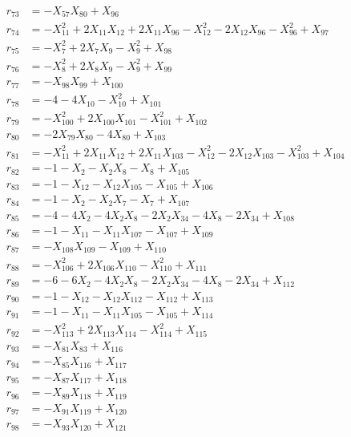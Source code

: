 \begin{align*}
r_{73} &= -X_{57}X_{80} + X_{96} \\[3pt]
r_{74} &= -X_{11}^{2} + 2X_{11}X_{12} + 2X_{11}X_{96} - X_{12}^{2} - 2X_{12}X_{96} - X_{96}^{2} + X_{97} \\[3pt]
r_{75} &= -X_{7}^{2} + 2X_{7}X_{9} - X_{9}^{2} + X_{98} \\[3pt]
r_{76} &= -X_{8}^{2} + 2X_{8}X_{9} - X_{9}^{2} + X_{99} \\[3pt]
r_{77} &= -X_{98}X_{99} + X_{100} \\[3pt]
r_{78} &= -4 - 4X_{10} - X_{10}^{2} + X_{101} \\[3pt]
r_{79} &= -X_{100}^{2} + 2X_{100}X_{101} - X_{101}^{2} + X_{102} \\[3pt]
r_{80} &= -2X_{79}X_{80} - 4X_{80} + X_{103} \\[3pt]
r_{81} &= -X_{11}^{2} + 2X_{11}X_{12} + 2X_{11}X_{103} - X_{12}^{2} - 2X_{12}X_{103} - X_{103}^{2} + X_{104} \\[3pt]
r_{82} &= -1 - X_{2} - X_{2}X_{8} - X_{8} + X_{105} \\[3pt]
r_{83} &= -1 - X_{12} - X_{12}X_{105} - X_{105} + X_{106} \\[3pt]
r_{84} &= -1 - X_{2} - X_{2}X_{7} - X_{7} + X_{107} \\[3pt]
r_{85} &= -4 - 4X_{2} - 4X_{2}X_{8} - 2X_{2}X_{34} - 4X_{8} - 2X_{34} + X_{108} \\[3pt]
r_{86} &= -1 - X_{11} - X_{11}X_{107} - X_{107} + X_{109} \\[3pt]
r_{87} &= -X_{108}X_{109} - X_{109} + X_{110} \\[3pt]
r_{88} &= -X_{106}^{2} + 2X_{106}X_{110} - X_{110}^{2} + X_{111} \\[3pt]
r_{89} &= -6 - 6X_{2} - 4X_{2}X_{8} - 2X_{2}X_{34} - 4X_{8} - 2X_{34} + X_{112} \\[3pt]
r_{90} &= -1 - X_{12} - X_{12}X_{112} - X_{112} + X_{113} \\[3pt]
r_{91} &= -1 - X_{11} - X_{11}X_{105} - X_{105} + X_{114} \\[3pt]
r_{92} &= -X_{113}^{2} + 2X_{113}X_{114} - X_{114}^{2} + X_{115} \\[3pt]
r_{93} &= -X_{81}X_{83} + X_{116} \\[3pt]
r_{94} &= -X_{85}X_{116} + X_{117} \\[3pt]
r_{95} &= -X_{87}X_{117} + X_{118} \\[3pt]
r_{96} &= -X_{89}X_{118} + X_{119} \\[3pt]
r_{97} &= -X_{91}X_{119} + X_{120} \\[3pt]
r_{98} &= -X_{93}X_{120} + X_{121} \\[3pt]

\end{align*}
